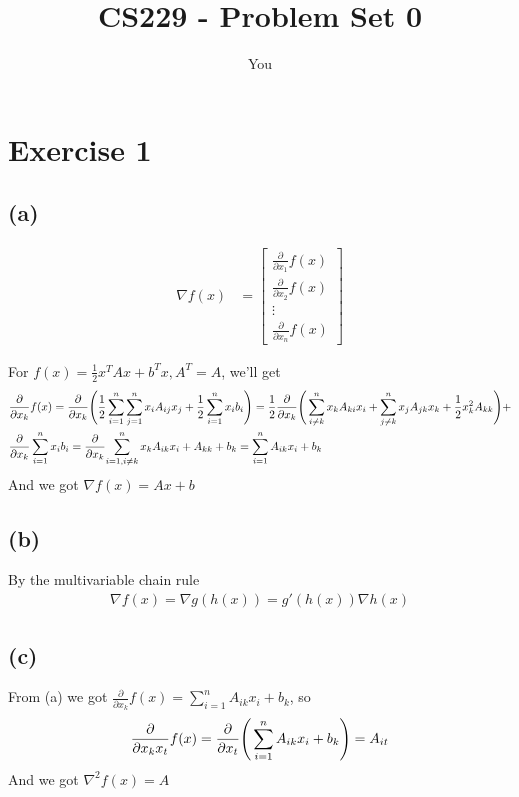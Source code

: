 \documentclass{article}
\title{CS229 - Problem Set 0}
\author{You}
\begin{document}
\section*{Exercise 1}
\subsection*{(a)}

\begin{align*}
  \nabla f(x) & = \begin{bmatrix}
    \frac{\partial}{\partial x_{1}} f(x) \\
    \frac{\partial}{\partial x_{2}} f(x) \\
    \vdots                               \\
    \frac{\partial}{\partial x_{n}} f(x)
  \end{bmatrix}
\end{align*}

For $f(x)= \frac{1}{2}x^TAx+b^Tx, A^T=A$, we'll get
\begin{align*}
    & \frac{\partial}{\partial x_{k}} f(x)=\frac{\partial}{\partial x_{k}} \Bigg{(}\frac{1}{2}\sum_{i=1}^{n}\sum_{j=1}^{n}x_{i}A_{ij}x_{j} + \frac{1}{2}\sum_{i=1}^{n}x_{i}b_{i}\Bigg{)} = \frac{1}{2}\frac{\partial}{\partial x_{k}}\Bigg{(}\sum_{i\not{=}k}^{n}x_{k}A_{ki}x_{i}+\sum_{j\not{=}k}^{n}x_{j}A_{jk}x_{k}+\frac{1}{2}x_{k}^2 A_{kk} \Bigg{)}+ \\
    & \frac{\partial}{\partial x_{k}} \sum_{i=1}^{n}x_{i}b_{i}=\frac{\partial}{\partial x_{k}}{\sum_{i=1,i\not{=}k}^{n}x_{k}A_{ik}x_{i}}+A_{kk}+b_{k}=\sum_{i=1}^{n}A_{ik}x_{i}+b_{k}
\end{align*}
And we got $\nabla f(x)=Ax+b$

\subsection*{(b)}

By the multivariable chain rule
\begin{align*}
  \nabla f(x) = \nabla g(h(x)) = g'(h(x)) \nabla h(x)
\end{align*}

\subsection*{(c)}

From (a) we got $\frac{\partial}{\partial x_{k}} f(x)= \sum_{i=1}^{n}A_{ik}x_{i} + b_{k}$, so
\begin{align*}
  \frac{\partial}{\partial x_{k}x_{t}} f(x)=\frac{\partial}{\partial x_{t}}\Bigg{(}\sum_{i=1}^{n}A_{ik}x_{i} + b_{k}\Bigg{)}=A_{it}
\end{align*}
And we got $\nabla^2 f(x)=A$
\end{document}
